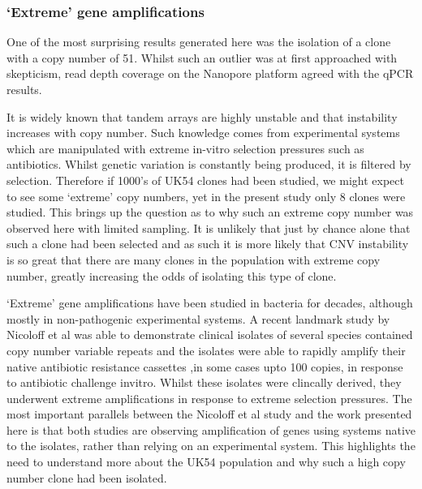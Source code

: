 \documentclass{article}
\begin{document}


\subsubsection{`Extreme' gene amplifications}
One of the most surprising results generated here was the isolation of a clone with a copy number of 51. Whilst such an outlier was at first approached with skepticism, read depth coverage on the Nanopore platform agreed with the qPCR results. 
 
It is widely known that tandem arrays are highly unstable and that instability increases with copy number. Such knowledge comes from experimental systems which are manipulated with extreme in-vitro selection pressures such as antibiotics. Whilst genetic variation is constantly being produced, it is filtered by selection. Therefore if 1000's of UK54 clones had been studied, we might expect to see some `extreme' copy numbers, yet in the present study only 8 clones were studied. This brings up the question as to why such an extreme copy number was observed here with limited sampling. It is unlikely that just by chance alone that such a clone had been selected and as such it is more likely that CNV instability is so great that there are many clones in the population with extreme copy number, greatly increasing the odds of isolating this type of clone.

`Extreme' gene amplifications have been studied in bacteria for decades, although mostly in non-pathogenic experimental systems. A recent landmark study by Nicoloff et al was able to demonstrate clinical isolates of several species contained copy number variable repeats and the isolates were able to rapidly amplify their native antibiotic resistance cassettes ,in some cases upto 100 copies, in response to antibiotic challenge invitro. Whilst these isolates were clincally derived, they underwent extreme amplifications in response to extreme selection pressures. The most important parallels between the Nicoloff et al study and the work presented here is that both studies are observing amplification of genes using systems native to the isolates, rather than relying on an experimental system. This highlights the need to understand more about the UK54 population and why such a high copy number clone had been isolated. 

\end{document}

